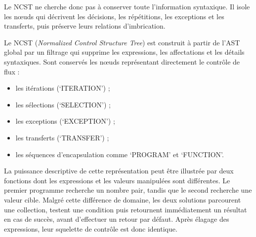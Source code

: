 Le NCST ne cherche donc pas à conserver toute l'information syntaxique. Il
isole les nœuds qui décrivent les décisions, les répétitions, les exceptions
et les transferts, puis préserve leurs relations d'imbrication.

Le NCST (\emph{Normalized Control Structure Tree}) est construit à partir de
l'AST global par un filtrage qui supprime les expressions, les affectations et
les détails syntaxiques. Sont conservés les nœuds représentant directement le
contrôle de flux :

\begin{itemize}
    \item les itérations (`ITERATION') ;
    \item les sélections (`SELECTION') ;
    \item les exceptions (`EXCEPTION') ;
    \item les transferts (`TRANSFER') ;
    \item les séquences d'encapsulation comme `PROGRAM' et `FUNCTION'.
\end{itemize}

La puissance descriptive de cette représentation peut être illustrée par
deux fonctions dont les expressions et les valeurs manipulées sont
différentes. Le premier programme recherche un nombre pair, tandis que le
second recherche une valeur cible. Malgré cette différence de domaine, les
deux solutions parcourent une collection, testent une condition puis
retournent immédiatement un résultat en cas de succès, avant d'effectuer un
retour par défaut. Après élagage des expressions, leur squelette de contrôle
est donc identique.

